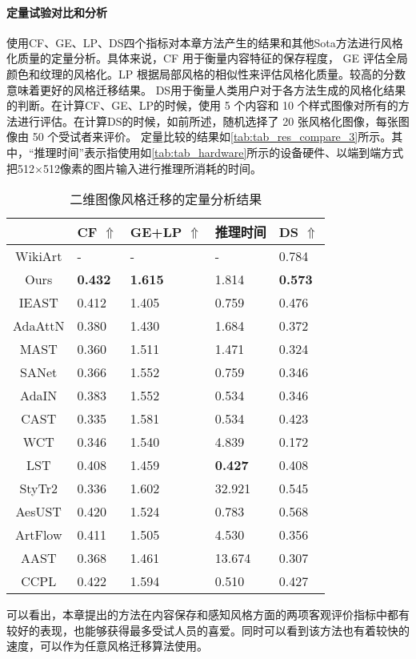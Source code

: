 \paragraph{定量试验对比和分析}
使用CF、GE、LP、DS四个指标对本章方法产生的结果和其他Sota方法进行风格化质量的定量分析。具体来说，CF 用于衡量内容特征的保存程度，
GE 评估全局颜色和纹理的风格化。LP 根据局部风格的相似性来评估风格化质量。较高的分数意味着更好的风格迁移结果。
DS用于衡量人类用户对于各方法生成的风格化结果的判断。在计算CF、GE、LP的时候，使用 5 个内容和 10 个样式图像对所有的方法进行评估。在计算DS的时候，如前所述，随机选择了 20 张风格化图像，每张图像由 50 个受试者来评价。
定量比较的结果如\autoref{tab:tab_res_compare_3}所示。其中，“推理时间”表示指使用如\autoref{tab:tab_hardware}所示的设备硬件、以端到端方式把512$\times$512像素的图片输入进行推理所消耗的时间。
\begin{table}[htb]
    \centering
    \caption{二维图像风格迁移的定量分析结果}
    \label{tab:tab_res_compare_3}
    \begin{tabularx}{\textwidth}{c X<{\centering} X<{\centering} X<{\centering} X<{\centering}}
        \hline
        & CF $\Uparrow$ & GE+LP $\Uparrow$ & 推理时间 & DS $\Uparrow$ \\ \hline
        WikiArt & - & - & - & 0.784 \\ 
        Ours & \textbf{0.432} & \textbf{1.615} & 1.814 & \textbf{0.573} \\
        IEAST & 0.412 & 1.405 & 0.759 & 0.476 \\ 
        AdaAttN & 0.380 & 1.430 & 1.684 & 0.372 \\ 
        MAST & 0.360 & 1.511 & 1.471 & 0.324 \\ 
        SANet & 0.366 & 1.552 & 0.759 & 0.346 \\ 
        AdaIN & 0.383 & 1.552 & 0.534 & 0.346 \\ 
        CAST & 0.335 & 1.581 & 0.534 & 0.423 \\ 
        WCT & 0.346 & 1.540 & 4.839 & 0.172 \\ 
        LST & 0.408 & 1.459 & \textbf{0.427} & 0.408 \\ 
        StyTr2 & 0.336 & 1.602 & 32.921 & 0.545 \\
        AesUST & 0.420 & 1.524 & 0.783 & 0.568 \\ 
        ArtFlow & 0.411 & 1.505 & 4.530 & 0.356 \\
        AAST & 0.368 & 1.461 & 13.674 & 0.307 \\ 
        CCPL & 0.422 & 1.594 & 0.510 & 0.427 \\ \hline
    \end{tabularx}
\end{table}
可以看出，本章提出的方法在内容保存和感知风格方面的两项客观评价指标中都有较好的表现，也能够获得最多受试人员的喜爱。同时可以看到该方法也有着较快的速度，可以作为任意风格迁移算法使用。
